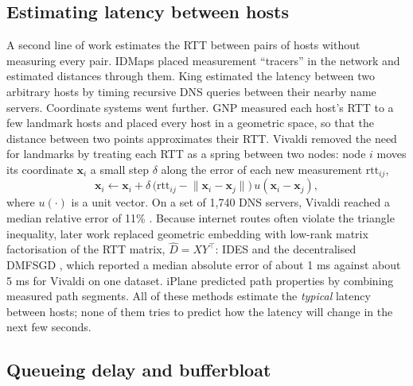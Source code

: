 \documentclass[pdflatex,sn-mathphys-num]{sn-jnl}
\begin{document}
\subsection{Estimating latency between hosts}

A second line of work estimates the RTT between pairs of hosts without measuring every pair. IDMaps \cite{francis2001idmaps} placed measurement ``tracers'' in the network and estimated distances through them. King \cite{gummadi2002king} estimated the latency between two arbitrary hosts by timing recursive DNS queries between their nearby name servers. Coordinate systems went further. GNP \cite{ng2002gnp} measured each host's RTT to a few landmark hosts and placed every host in a geometric space, so that the distance between two points approximates their RTT. Vivaldi \cite{dabek2004vivaldi} removed the need for landmarks by treating each RTT as a spring between two nodes: node $i$ moves its coordinate $\mathbf{x}_i$ a small step $\delta$ along the error of each new measurement $\mathrm{rtt}_{ij}$,
\begin{equation}
\mathbf{x}_i \leftarrow \mathbf{x}_i + \delta\,\big(\mathrm{rtt}_{ij} - \lVert\mathbf{x}_i - \mathbf{x}_j\rVert\big)\,u(\mathbf{x}_i - \mathbf{x}_j),
\label{eq:vivaldi}
\end{equation}
where $u(\cdot)$ is a unit vector. On a set of 1{,}740 DNS servers, Vivaldi reached a median relative error of 11\% \cite{dabek2004vivaldi}. Because internet routes often violate the triangle inequality, later work replaced geometric embedding with low-rank matrix factorisation of the RTT matrix, $\hat{D} = XY^{\top}$: IDES \cite{mao2006ides} and the decentralised DMFSGD \cite{liao2012dmfsgd}, which reported a median absolute error of about 1 ms against about 5 ms for Vivaldi on one dataset. iPlane \cite{madhyastha2006iplane} predicted path properties by combining measured path segments. All of these methods estimate the \emph{typical} latency between hosts; none of them tries to predict how the latency will change in the next few seconds.

\subsection{Queueing delay and bufferbloat}
\end{document}
